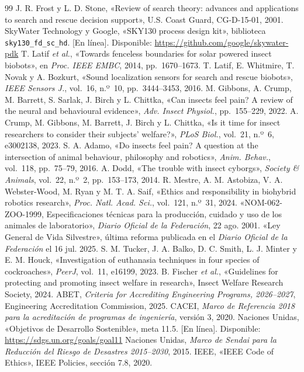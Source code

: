 {\begin{thebibliography}{99}
 J. R. Frost y L. D. Stone, «Review of search theory: advances and applications to search and rescue decision support», U.S. Coast Guard, CG-D-15-01, 2001.
 SkyWater Technology y Google, «SKY130 process design kit», biblioteca \texttt{sky130\_fd\_sc\_hd}. [En línea]. Disponible: \url{https://github.com/google/skywater-pdk}
 T. Latif \textit{et al.}, «Towards fenceless boundaries for solar powered insect biobots», en \textit{Proc. IEEE EMBC}, 2014, pp.~1670--1673.
 T. Latif, E. Whitmire, T. Novak y A. Bozkurt, «Sound localization sensors for search and rescue biobots», \textit{IEEE Sensors J.}, vol.~16, n.º~10, pp.~3444--3453, 2016.
 M. Gibbons, A. Crump, M. Barrett, S. Sarlak, J. Birch y L. Chittka, «Can insects feel pain? A review of the neural and behavioural evidence», \textit{Adv. Insect Physiol.}, pp.~155--229, 2022.
 A. Crump, M. Gibbons, M. Barrett, J. Birch y L. Chittka, «Is it time for insect researchers to consider their subjects' welfare?», \textit{PLoS Biol.}, vol.~21, n.º~6, e3002138, 2023.
 S. A. Adamo, «Do insects feel pain? A question at the intersection of animal behaviour, philosophy and robotics», \textit{Anim. Behav.}, vol.~118, pp.~75--79, 2016.
 A. Dodd, «The trouble with insect cyborgs», \textit{Society \& Animals}, vol.~22, n.º~2, pp.~153--173, 2014.
 R. Mestre, A. M. Astobiza, V. A. Webster-Wood, M. Ryan y M. T. A. Saif, «Ethics and responsibility in biohybrid robotics research», \textit{Proc. Natl. Acad. Sci.}, vol.~121, n.º~31, 2024.
 «NOM-062-ZOO-1999, Especificaciones técnicas para la producción, cuidado y uso de los animales de laboratorio», \textit{Diario Oficial de la Federación}, 22 ago. 2001.
 «Ley General de Vida Silvestre», última reforma publicada en el \textit{Diario Oficial de la Federación} el 16 jul. 2025.
 S. M. Tucker, J. A. Balko, D. C. Smith, L. J. Minter y E. M. Houck, «Investigation of euthanasia techniques in four species of cockroaches», \textit{PeerJ}, vol.~11, e16199, 2023.
 B. Fischer \textit{et al.}, «Guidelines for protecting and promoting insect welfare in research», Insect Welfare Research Society, 2024.
 ABET, \textit{Criteria for Accrediting Engineering Programs, 2026--2027}, Engineering Accreditation Commission, 2025.
 CACEI, \textit{Marco de Referencia 2018 para la acreditación de programas de ingeniería}, versión 3, 2020.
 Naciones Unidas, «Objetivos de Desarrollo Sostenible», meta 11.5. [En línea]. Disponible: \url{https://sdgs.un.org/goals/goal11}
 Naciones Unidas, \textit{Marco de Sendai para la Reducción del Riesgo de Desastres 2015--2030}, 2015.
 IEEE, «IEEE Code of Ethics», IEEE Policies, sección 7.8, 2020.

\end{thebibliography}}
